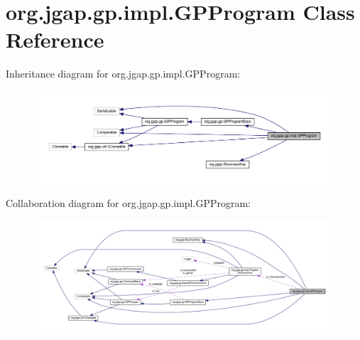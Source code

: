 \hypertarget{classorg_1_1jgap_1_1gp_1_1impl_1_1_g_p_program}{\section{org.\-jgap.\-gp.\-impl.\-G\-P\-Program Class Reference}
\label{classorg_1_1jgap_1_1gp_1_1impl_1_1_g_p_program}
}


Inheritance diagram for org.\-jgap.\-gp.\-impl.\-G\-P\-Program\-:
\nopagebreak
\begin{figure}[H]
\begin{center}
\leavevmode
\includegraphics[width=350pt]{classorg_1_1jgap_1_1gp_1_1impl_1_1_g_p_program__inherit__graph}
\end{center}
\end{figure}


Collaboration diagram for org.\-jgap.\-gp.\-impl.\-G\-P\-Program\-:
\nopagebreak
\begin{figure}[H]
\begin{center}
\leavevmode
\includegraphics[width=350pt]{classorg_1_1jgap_1_1gp_1_1impl_1_1_g_p_program__coll__graph}
\end{center}
\end{figure}
